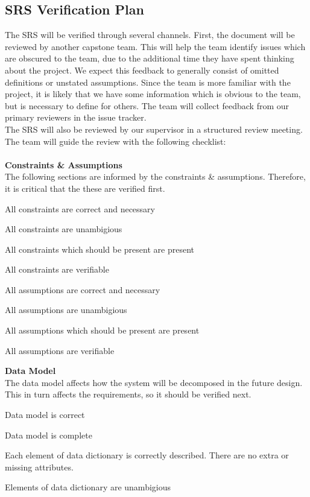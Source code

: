 \documentclass[12pt, titlepage]{article}
\begin{document}

\subsection{SRS Verification Plan}

The SRS will be verified through several channels. First, the document will be reviewed by another capstone team. This will help the team identify issues
which are obscured to the team, due to the additional time they have spent thinking about the project. We expect this feedback to generally consist of 
omitted definitions or unstated assumptions. Since the team is more familiar with the project, it is likely that we have some information which is obvious 
to the team, but is necessary to define for others. The team will collect feedback from our primary reviewers in the issue tracker.\\
The SRS will also be reviewed by our supervisor in a structured review meeting. The team will guide the review with the following checklist:\\\\
\textbf{Constraints \& Assumptions}\\
The following sections are informed by the constraints \& assumptions. Therefore, it is critical that the these are verified first.
\begin{todolist}
\item All constraints are correct and necessary
\item All constraints are unambigious
\item All constraints which should be present are present
\item All constraints are verifiable
\item All assumptions are correct and necessary
\item All assumptions are unambigious
\item All assumptions which should be present are present
\item All assumptions are verifiable
\end{todolist}
\textbf{Data Model}\\
The data model affects how the system will be decomposed in the future design. This in turn affects the requirements, so it should be verified next.
\begin{todolist}
  \item Data model is correct
  \item Data model is complete
  \item Each element of data dictionary is correctly described. There are no extra or missing attributes.
  \item Elements of data dictionary are unambigious
\end{todolist}
\end{document}

